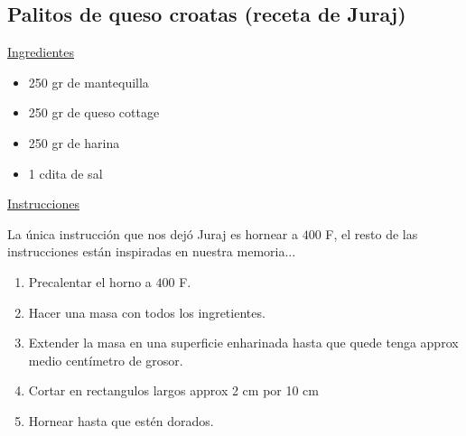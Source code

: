 \subsection{Palitos de queso croatas (receta de Juraj)}
\underline{Ingredientes}
\begin{itemize}
\item 250 gr de mantequilla
\item 250 gr de queso cottage
\item 250 gr de harina
\item 1 cdita de sal

\end{itemize}

\underline{Instrucciones}

La única instrucción que nos dejó Juraj es hornear a $400$ F, el resto de las instrucciones están inspiradas en nuestra memoria...

\begin{enumerate}
\item Precalentar el horno a $400$ F. 
\item Hacer una masa con todos los ingretientes.
\item Extender la masa en una superficie enharinada hasta que quede tenga approx medio centímetro de grosor.
\item Cortar en rectangulos largos approx 2 cm por 10 cm
\item Hornear hasta que estén dorados.

\end{enumerate}
